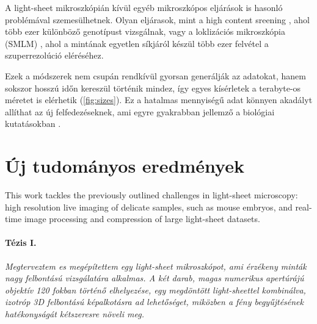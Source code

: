 \documentclass{booklet_style}
\begin{document}
A light-sheet mikroszkópián kívül egyéb mikroszkópos eljárások is hasonló problémával szemesülhetnek. Olyan eljárasok, mint a high content sreening \cite{carpenter_systematic_2004,echeverri_high-throughput_2006,pepperkok_high-throughput_2006}, ahol több ezer különböző genotípust vizsgálnak, vagy a loklizációs mikroszkópia (SMLM) \cite{betzig_imaging_2006,hess_ultra-high_2006,rust_sub-diffraction-limit_2006}, ahol a mintának egyetlen síkjáról készül több ezer felvétel a szuperrezolúció eléréséhez.

Ezek a módszerek nem csupán rendkívül gyorsan generálják az adatokat, hanem sokszor hosszú időn kereszül történik mindez, így egyes kísérletek a terabyte-os méretet is elérhetik (\autoref{fig:sizes}).
Ez a hatalmas mennyiségű adat könnyen akadályt allíthat az új felfedezéseknek, ami egyre gyakrabban jellemző a biológiai kutatásokban \cite{wollman_high_2007,reynaud_guide_2015,perkel_struggle_2016}.









\section{Új tudományos eredmények}

This work tackles the previously outlined challenges in light-sheet microscopy: high resolution live imaging of delicate samples, such as mouse embryos, and real-time image processing and compression of large light-sheet datasets.

  \paragraph{Tézis I.}\textit{Megterveztem es megépítettem egy light-sheet mikroszkópot, ami érzékeny minták nagy felbontású vizsgálatára alkalmas. A két darab, magas numerikus apertúrájú objektív 120 fokban történő elhelyezése, egy megdöntött light-sheettel kombinálva, izotróp 3D felbontású képalkotásra ad lehetőséget, miközben a fény begyűjtésének hatékonyságát kétszeresre növeli meg.}
  
\end{document}
